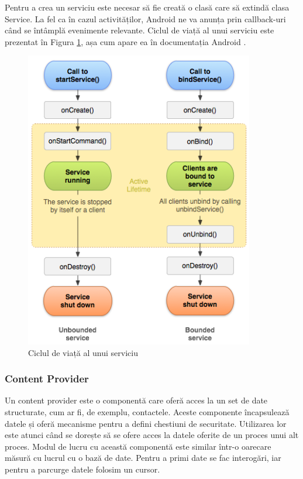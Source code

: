 \documentclass[12pt,a4paper]{article}
\begin{document}
Pentru a crea un serviciu este necesar să fie creată o clasă care să extindă clasa Service. La fel ca în cazul activităților, Android ne va anunța prin callback-uri când se întâmplă evenimente relevante. Ciclul de viață al unui serviciu este prezentat în Figura \ref{fig:service_lifecycle}, așa cum apare ea în documentația Android \cite{DeveloperAndroid}.

\begin{figure}[h]
\centering
\includegraphics[width=10cm]{figures/service_lifecycle.png}
\caption{Ciclul de viață al unui serviciu}
\label{fig:service_lifecycle}
\end{figure}

\subsubsection{Content Provider}
Un content provider este o componentă care oferă acces la un set de date structurate, cum ar fi, de exemplu, contactele. Aceste componente încapsulează datele și oferă mecanisme pentru a defini chestiuni de securitate. Utilizarea lor este atunci când se dorește să se ofere acces la datele oferite de un proces unui alt proces.
Modul de lucru cu această componentă este similar într-o oarecare măsură cu lucrul cu o bază de date. Pentru a primi date se fac interogări, iar pentru a parcurge datele folosim un cursor.
\end{document}
